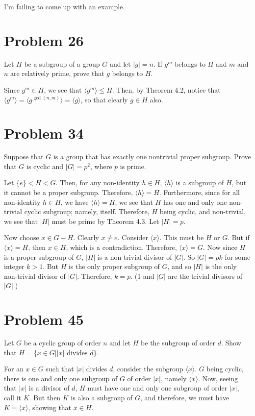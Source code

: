 \documentclass[12pt]{article}
\begin{document}
I'm failing to come up with an example.

\section*{Problem 26}

Let $H$ be a subgroup of a group $G$ and let $|g|=n$.  If $g^m$ belongs to $H$
and $m$ and $n$ are relatively prime, prove that $g$ belongs to $H$.

Since $g^m\in H$, we see that $\langle g^m\rangle\leq H$.
Then, by Theorem 4.2, notice that $\langle g^m\rangle=\langle g^{\gcd(n,m)}\rangle=\langle g\rangle$,
so that clearly $g\in H$ also.

\section*{Problem 34}

Suppose that $G$ is a group that has exactly one nontrivial proper subgroup.
Prove that $G$ is cyclic and $|G|=p^2$, where $p$ is prime.

Let $\{e\}<H<G$.  Then, for any non-identity $h\in H$, $\langle h\rangle$ is a subgroup of $H$,
but it cannot be a proper subgroup.  Therefore, $\langle h\rangle=H$.  Furthermore,
since for all non-identity $h\in H$, we have $\langle h\rangle = H$, we see that $H$ has one and
only one non-trivial cyclic subgroup; namely, itself.  Therefore, $H$ being cyclic, and non-trivial, we
see that $|H|$ must be prime by Theorem 4.3.  Let $|H|=p$.

Now choose $x\in G-H$.  Clearly $x\neq e$.  Consider $\langle x\rangle$.
This must be $H$ or $G$.  But if $\langle x\rangle=H$, then $x\in H$, which is
a contradiction.  Therefore, $\langle x\rangle=G$.  Now since $H$ is a
proper subgroup of $G$, $|H|$ is a non-trivial divisor of $|G|$.
So $|G|=pk$ for some integer $k>1$.  But $H$ is the only proper
subgroup of $G$, and so $|H|$ is the only non-trivial divisor of $|G|$.
Therefore, $k=p$.  (1 and $|G|$ are the trivial divisors of $|G|$.)

\section*{Problem 45}

Let $G$ be a cyclic group of order $n$ and let $H$ be the subgroup of order $d$.
Show that $H=\{x\in G|\mbox{$|x|$ divides $d$}\}$.

For an $x\in G$ such that $|x|$ divides $d$, consider the subgroup $\langle x\rangle$.
$G$ being cyclic, there is one and only one subgroup of $G$ of order $|x|$, namely $\langle x\rangle$.
Now, seeing that $|x|$ is a divisor of $d$, $H$ must have one and only one subgroup of order $|x|$,
call it $K$.  But then $K$ is also a subgroup of $G$, and therefore, we must have $K=\langle x\rangle$,
showing that $x\in H$.
\end{document}
